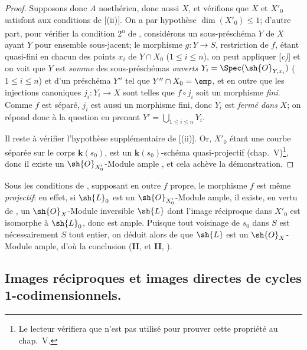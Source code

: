\begin{proof}
Supposons donc $A$ noethérien, donc aussi $X$, et vérifions que $X$ et $X'_0$ satisfont aux conditions de [(ii)].
On a par hypothèse $\dim(X'_0)\leq1$;
d'autre part, pour vérifier la condition 2\textsuperscript{o} de , considérons un sous-préschéma $Y$ de $X$ ayant $Y$ pour ensemble sous-jacent;
le morphisme $g:Y\to S$, restriction de $f$, étant quasi-fini en chacun des points $x_i$ de $Y\cap X_0$ ($1\leq i\leq n$), on peut appliquer [\emph{c)}] et on voit que $Y$ est \emph{somme} des sous-préschémas \emph{ouverts} $Y_i=\Spec(\sh{O}_{Y,x_i})$ ($1\leq i\leq n$) et d'un préschéma $Y''$ tel que $Y''\cap X_0=\emp$, et en outre que les injections canoniques $j_i:Y_i\to X$ sont telles que $f\circ j_i$ soit un morphisme \emph{fini}.
Comme $f$ est séparé, $j_i$ est aussi un morphisme fini, donc $Y_i$ est \emph{fermé dans} $X$;
on répond donc à la question en prenant $Y'=\bigcup_{1\leq i\leq n}Y_i$.

Il reste à vérifier l'hypothèse supplémentaire de [(ii)].
Or, $X'_0$ étant une courbe séparée sur le corps $\boldsymbol{k}(s_0)$, est un $\boldsymbol{k}(s_0)$-schéma quasi-projectif (chap.~V)\footnote{Le lecteur vérifiera que  n'est pas utilisé pour prouver cette propriété au chap.~V.}, donc il existe un $\sh{O}_{X'_0}$-Module ample , et cela achève la démonstration.
\end{proof}

\begin{remark}[21.9.13]
\label{IV.21.9.13}
Sous les conditions de , supposant en outre $f$ propre, le morphisme $f$ est même \emph{projectif}:
en effet, si $\sh{L}_0$ est un $\sh{O}_{X'_0}$-Module ample, il existe, en vertu de , un $\sh{O}_X$-Module inversible $\sh{L}$ dont l'image réciproque dans $X'_0$ est isomorphe à $\sh{L}_0$, donc est ample.
Puisque tout voisinage de $s_0$ dans $S$ est nécessairement $S$ tout entier, on déduit alors de  que $\sh{L}$ est un $\sh{O}_X$-Module ample, d'où la conclusion (\textbf{II},  et \textbf{II}, ).
\end{remark}

\subsection{Images réciproques et images directes de cycles 1-codimensionnels.}

